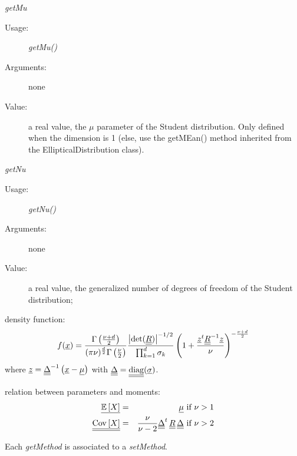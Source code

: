 \begin{description}
\begin{description}
\item \textit{getMu}
\begin{description}
\item[Usage:] \textit{getMu()}
\item[Arguments:] none
\item[Value:]  a real value, the $\mu$ parameter of the Student distribution. Only defined when the dimension is 1 (else, use the getMEan() method inherited from the EllipticalDistribution class).
\end{description}
\bigskip
\item \textit{getNu}
\begin{description}
\item[Usage:] \textit{getNu()}
\item[Arguments:] none
\item[Value:]  a real value, the generalized number of degrees of freedom of the Student distribution;
\end{description}
\bigskip
\end{description}

\item[Details:]  \rule{0pt}{1em}
\begin{description}
\item density function:
\begin{equation}
f({\underline{x}}) = \frac{\Gamma\left(\frac{\nu+d}{2}\right)}
{(\pi \nu)^{\frac{d}{2}}\Gamma\left(\frac{\nu}{2}\right)}\frac{\left|\mathrm{det}({\underline{\underline{R}}})\right|^{-1/2}}{\prod_{k=1}^d\sigma_k}\left(1+\frac{{\underline{z}}^t{\underline{\underline{R}}}^{-1}{\underline{z}}}{\nu}\right)^{-\frac{\nu+d}{2}}
\end{equation}
where ${\underline{z}}={\underline{\underline{\Delta}}}^{-1}\left({\underline{x}}-{\underline{\mu}}\right)$ with ${\underline{\underline{\Delta}}}={\underline{\underline{\mathrm{diag}}}}({\underline{\sigma}})$.
\item relation between parameters and moments:
\begin{eqnarray*}
{\underline{{\mathbb E}\left[ X \right]}} & = & {\underline{\mu}}\mbox{ if }\nu>1\\
{\underline{\underline{{\rm Cov}\left[ X \right]}}} & = & \displaystyle \frac{\nu}{\nu-2}{\underline{\underline{\Delta}}}^t\,{\underline{\underline{R}}}\,{\underline{\underline{\Delta}}}\mbox{ if }\nu>2
\end{eqnarray*}
\end{description}

\item[Links:]  \rule{0pt}{1em}
\end{description}


Each  \textit{getMethod}  is associated to a \textit{setMethod}.

